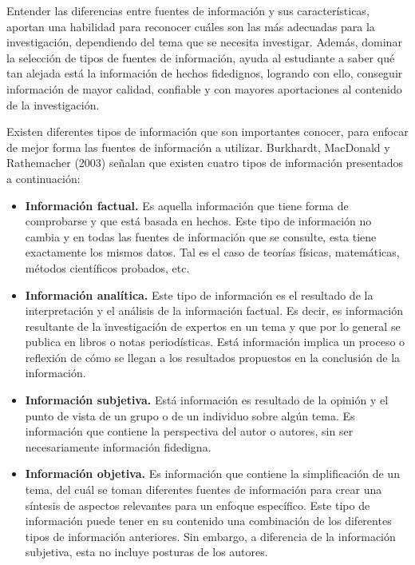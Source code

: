 Entender las diferencias entre fuentes de información y sus características, aportan una habilidad para reconocer cuáles son las más adecuadas para la investigación, dependiendo del tema que se necesita investigar. Además, dominar la selección de tipos de fuentes de información, ayuda al estudiante a saber qué tan alejada está la información de hechos fidedignos, logrando con ello, conseguir información de mayor calidad, confiable y con mayores aportaciones al contenido de la investigación.

Existen diferentes tipos de información que son importantes conocer, para enfocar de mejor forma las fuentes de información a utilizar. Burkhardt, MacDonald y Rathemacher (2003) señalan que existen cuatro tipos de información presentados a continuación:

\begin{itemize}
  \item \textbf{Información factual.} Es aquella información que tiene forma de comprobarse y que está basada en hechos. Este tipo de información no cambia y en todas las fuentes de información que se consulte, esta tiene exactamente los mismos datos. Tal es el caso de teorías físicas, matemáticas, métodos científicos probados, etc.
  \item \textbf{Información analítica.} Este tipo de información es el resultado de la interpretación y el análisis de la información factual. Es decir, es información resultante de la investigación de expertos en un tema y que por lo general se publica en libros o notas periodísticas. Está información implica un proceso o reflexión de cómo se llegan a los resultados propuestos en la conclusión de la información.
  \item \textbf{Información subjetiva.} Está información es resultado de la opinión y el punto de vista de un grupo o de un individuo sobre algún tema. Es información que contiene la perspectiva del autor o autores, sin ser necesariamente información fidedigna.
  \item \textbf{Información objetiva.} Es información que contiene la simplificación de un tema, del cuál se toman diferentes fuentes de información para crear una síntesis de aspectos relevantes para un enfoque específico. Este tipo de información puede tener en su contenido una combinación de los diferentes tipos de información anteriores. Sin embargo, a diferencia de la información subjetiva, esta no incluye posturas de los autores.
\end{itemize}

